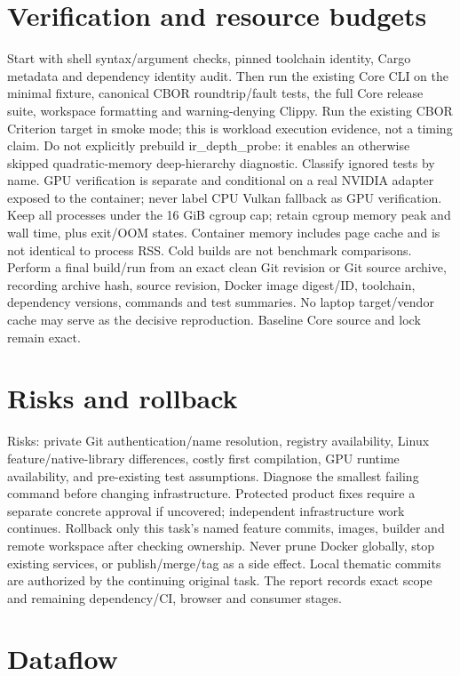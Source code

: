 \documentclass[11pt,a4paper]{article}
\begin{document}
\section{Verification and resource budgets}
Start with shell syntax/argument checks, pinned toolchain identity, Cargo metadata
and dependency identity audit. Then run the existing Core CLI on the minimal
fixture, canonical CBOR roundtrip/fault tests, the full Core release suite,
workspace formatting and warning-denying Clippy. Run the existing CBOR Criterion
target in smoke mode; this is workload execution evidence, not a timing claim.
Do not explicitly prebuild ir\_depth\_probe: it enables an otherwise skipped
quadratic-memory deep-hierarchy diagnostic. Classify ignored tests by name.
GPU verification is separate and conditional on a real NVIDIA adapter exposed
to the container; never label CPU Vulkan fallback as GPU verification.
Keep all processes under the 16 GiB cgroup cap; retain cgroup memory peak and
wall time, plus exit/OOM states. Container memory includes page cache and is not
identical to process RSS. Cold builds are not benchmark comparisons.
Perform a final build/run from an exact clean Git revision or Git source archive,
recording archive hash, source revision, Docker image digest/ID, toolchain,
dependency versions, commands and test summaries. No laptop target/vendor cache
may serve as the decisive reproduction. Baseline Core source and lock remain exact.
\section{Risks and rollback}
Risks: private Git authentication/name resolution, registry availability,
Linux feature/native-library differences, costly first compilation, GPU runtime
availability, and pre-existing test assumptions. Diagnose the smallest failing
command before changing infrastructure. Protected product fixes require a
separate concrete approval if uncovered; independent infrastructure work continues.
Rollback only this task's named feature commits, images, builder and remote
workspace after checking ownership. Never prune Docker globally, stop existing
services, or publish/merge/tag as a side effect. Local thematic commits are
authorized by the continuing original task. The report records exact scope and
remaining dependency/CI, browser and consumer stages.
\section{Dataflow}

\end{document}
